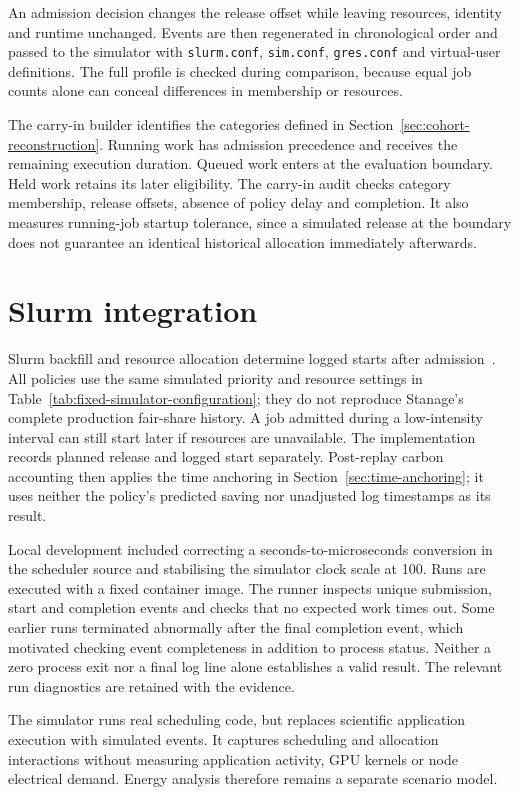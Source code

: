 An admission decision changes the release offset while leaving resources, identity and runtime unchanged. Events are then regenerated in chronological order and passed to the simulator with \texttt{slurm.conf}, \texttt{sim.conf}, \texttt{gres.conf} and virtual-user definitions. The full profile is checked during comparison, because equal job counts alone can conceal differences in membership or resources.

The carry-in builder identifies the categories defined in Section~\ref{sec:cohort-reconstruction}. Running work has admission precedence and receives the remaining execution duration. Queued work enters at the evaluation boundary. Held work retains its later eligibility. The carry-in audit checks category membership, release offsets, absence of policy delay and completion. It also measures running-job startup tolerance, since a simulated release at the boundary does not guarantee an identical historical allocation immediately afterwards.

\section{Slurm integration}
Slurm backfill and resource allocation determine logged starts after admission~\cite{schedmdScheduling}. All policies use the same simulated priority and resource settings in Table~\ref{tab:fixed-simulator-configuration}; they do not reproduce Stanage's complete production fair-share history. A job admitted during a low-intensity interval can still start later if resources are unavailable. The implementation records planned release and logged start separately. Post-replay carbon accounting then applies the time anchoring in Section~\ref{sec:time-anchoring}; it uses neither the policy's predicted saving nor unadjusted log timestamps as its result.

Local development included correcting a seconds-to-microseconds conversion in the scheduler source and stabilising the simulator clock scale at 100. Runs are executed with a fixed container image. The runner inspects unique submission, start and completion events and checks that no expected work times out. Some earlier runs terminated abnormally after the final completion event, which motivated checking event completeness in addition to process status. Neither a zero process exit nor a final log line alone establishes a valid result. The relevant run diagnostics are retained with the evidence.

The simulator runs real scheduling code, but replaces scientific application execution with simulated events. It captures scheduling and allocation interactions without measuring application activity, GPU kernels or node electrical demand. Energy analysis therefore remains a separate scenario model.

